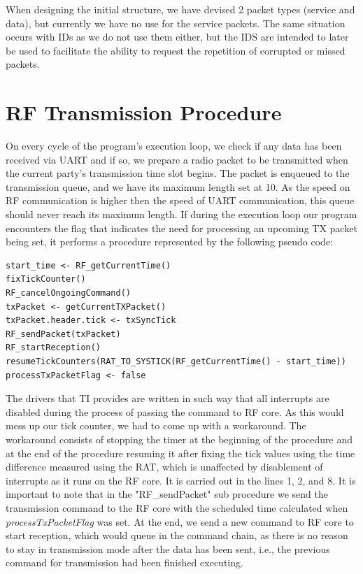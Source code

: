 When designing the initial structure, we have devised 2 packet types (service and data), but currently we have no use for the service packets. The same situation occurs with IDs as we do not use them either, but the IDS are intended to later be used to facilitate the ability to request the repetition of corrupted or missed packets.

\section{RF Transmission Procedure}

On every cycle of the program's execution loop, we check if any data has been received via UART and if so, we prepare a radio packet to be transmitted when the current party's transmission time slot begins. The packet is enqueued to the transmission queue, and we have its maximum length set at 10. As the speed on RF communication is higher then the speed of UART communication, this queue should never reach its maximum length. 
If during the execution loop our program encounters the flag that indicates the need for processing an upcoming TX packet being set, it performs a procedure represented by the following pseudo code:

\lstset{language=c, showstringspaces=false, tabsize=1, breaklines=true, breakatwhitespace=false, framexleftmargin=20pt,numbers=left, 
numberstyle=\small,numbersep=10pt,frame=single,captionpos=t,xleftmargin=.061\textwidth}
\begin{center}
\begin{lstlisting}[caption=RF Transmission Preperation Procedure, label=nodemcuconfig]
start_time <- RF_getCurrentTime()
fixTickCounter()
RF_cancelOngoingCommand()
txPacket <- getCurrentTXPacket()
txPacket.header.tick <- txSyncTick
RF_sendPacket(txPacket)
RF_startReception()
resumeTickCounters(RAT_TO_SYSTICK(RF_getCurrentTime() - start_time))
processTxPacketFlag <- false
\end{lstlisting}
\end{center}

The drivers that TI provides are written in such way that all interrupts are disabled during the process of passing the command to RF core. As this would mess up our tick counter, we had to come up with a workaround. The workaround consists of stopping the timer at the beginning of the procedure and at the end of the procedure resuming it after fixing the tick values using the time difference measured using the RAT, which is unaffected by disablement of interrupts as it runs on the RF core. It is carried out in the lines 1, 2, and 8. It is important to note that in the "RF\_sendPacket" sub procedure we send the transmission command to the RF core with the scheduled time calculated when \emph{processTxPacketFlag} was set. At the end, we send a new command to RF core to start reception, which would queue in the command chain, as there is no reason to stay in transmission mode after the data has been sent, i.e., the previous command for transmission had been finished executing. 

